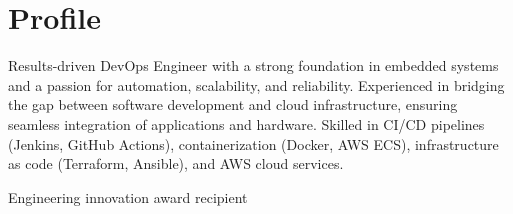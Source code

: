 \documentclass[letterpaper]{tenseconds} %
\begin{document}
\makeprofile %

\section{Profile}
\textnormal{\faInfo} Results-driven DevOps Engineer with a strong foundation in embedded systems and a passion for automation, scalability, and reliability. Experienced in bridging the gap between software development and cloud infrastructure, ensuring seamless integration of applications and hardware. Skilled in CI/CD pipelines (Jenkins, GitHub Actions), containerization (Docker, AWS ECS), infrastructure as code (Terraform, Ansible), and AWS cloud services.


 
\textnormal{\textcolor{materialamber}{\faTrophy}} Engineering innovation award recipient

\end{document}
